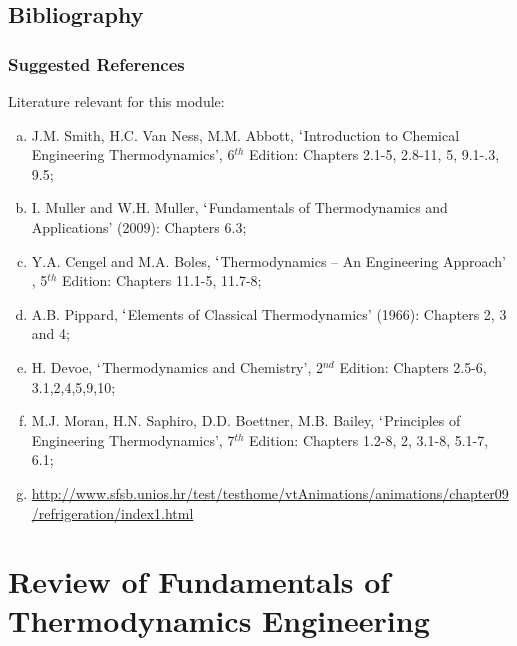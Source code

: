 \documentclass[10pt,compress]{beamer}
\begin{document}
 \subsection{Bibliography} 
   \begin{frame}
     \frametitle{Suggested References}
       Literature relevant for this module:
     \begin{enumerate}[(a)]
       \item J.M. Smith, H.C. Van Ness, M.M. Abbott, $\lq$Introduction to Chemical Engineering Thermodynamics', 6$^{th}$ Edition: Chapters 2.1-5, 2.8-11, 5, 9.1-.3, 9.5;
       \item I. Muller and W.H. Muller, $\lq$Fundamentals of Thermodynamics and Applications' (2009): Chapters 6.3;
       \item Y.A. Cengel and M.A. Boles, $\lq$Thermodynamics -- An Engineering Approach' , 5$^{th}$ Edition: Chapters 11.1-5, 11.7-8;
       \item A.B. Pippard, $\lq$Elements of Classical Thermodynamics' (1966): Chapters 2, 3 and 4;
       \item H. Devoe, $\lq$Thermodynamics and Chemistry', 2$^{nd}$ Edition: Chapters 2.5-6, 3.1,2,4,5,9,10;
       \item M.J. Moran, H.N. Saphiro, D.D. Boettner, M.B. Bailey, $\lq$Principles of Engineering Thermodynamics', 7$^{th}$ Edition: Chapters 1.2-8, 2, 3.1-8, 5.1-7, 6.1;
      \item \href{http://www.sfsb.unios.hr/test/testhome/vtAnimations/animations/chapter09/refrigeration/index1.html}{\tiny{http://www.sfsb.unios.hr/test/testhome/vtAnimations/animations/chapter09/refrigeration/index1.html}}
     \end{enumerate}
\end{frame}


 \section{Review of Fundamentals of Thermodynamics Engineering}

\end{document}
